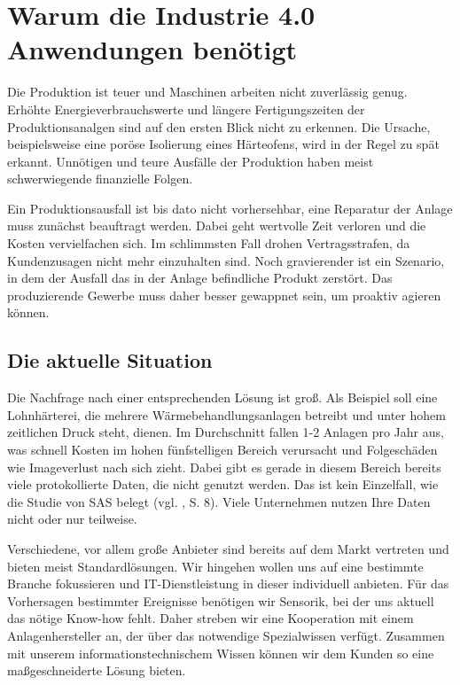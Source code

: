\section{Warum die Industrie 4.0 Anwendungen benötigt}

Die Produktion ist teuer und Maschinen arbeiten nicht zuverlässig genug. Erhöhte Energieverbrauchswerte und längere Fertigungszeiten der Produktionsanalgen sind auf den ersten Blick nicht zu erkennen. Die Ursache, beispielsweise eine poröse Isolierung eines Härteofens, wird in der Regel zu spät erkannt. Unnötigen und teure Ausfälle der Produktion haben meist schwerwiegende finanzielle Folgen.

Ein Produktionsausfall ist bis dato nicht vorhersehbar, eine Reparatur der Anlage muss zunächst beauftragt werden. Dabei geht wertvolle Zeit verloren und die Kosten vervielfachen sich. Im schlimmsten Fall drohen Vertragsstrafen, da Kundenzusagen nicht mehr einzuhalten sind. Noch gravierender ist ein Szenario, in dem der Ausfall das in der Anlage befindliche Produkt zerstört. Das produzierende Gewerbe muss daher besser gewappnet sein, um proaktiv agieren können. 


\subsection{Die aktuelle Situation}
Die Nachfrage nach einer entsprechenden Lösung ist groß. Als Beispiel soll eine Lohnhärterei, die mehrere Wärmebehandlungsanlagen betreibt und unter hohem zeitlichen Druck steht, dienen. Im Durchschnitt fallen 1-2 Anlagen pro Jahr aus, was schnell Kosten im hohen fünfstelligen Bereich verursacht und Folgeschäden wie Imageverlust nach sich zieht. Dabei gibt es gerade in diesem Bereich bereits viele protokollierte Daten, die nicht genutzt werden. Das ist kein Einzelfall, wie die Studie von SAS belegt (vgl. \cite{SasForsa}, S. 8). Viele Unternehmen nutzen Ihre Daten nicht oder nur teilweise.

Verschiedene, vor allem große Anbieter sind bereits auf dem Markt vertreten und bieten meist Standardlösungen. Wir hingehen wollen uns auf eine bestimmte Branche fokussieren und IT-Dienstleistung in dieser individuell anbieten. Für das Vorhersagen bestimmter Ereignisse benötigen wir Sensorik, bei der uns aktuell das nötige Know-how fehlt. Daher streben wir eine Kooperation mit einem Anlagenhersteller an, der über das notwendige Spezialwissen verfügt. Zusammen mit unserem informationstechnischem Wissen können wir dem Kunden so eine maßgeschneiderte Lösung bieten.

